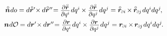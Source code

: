 \nopagebreak\vspace{-0.1em}\en{\vspace{-0.32em}}
\begin{equation}\label{areavectorascrossproduct}
\begin{array}{c}
\initialunitnormal \hspace{.1ex} do = d \initiallocationvector{'} \hspace{-0.5ex} \times \hspace{-0.1ex} d \initiallocationvector{''} \hspace{-0.5ex}
= \scalebox{0.9}{$ \displaystyle\frac{\raisemath{-0.2em}{\partial \initiallocationvector}}{\partial q^i} $} \hspace{.2ex} d q^i \hspace{-0.1ex} \times \scalebox{0.9}{$ \displaystyle\frac{\raisemath{-0.2em}{\partial \initiallocationvector}}{\partial q^{j}} $} \hspace{.2ex} d q^{j}
= \initiallocationvector_\differentialindex{i} \hspace{-0.16ex} \times \hspace{-0.1ex} \initiallocationvector_\differentialindex{\hspace{-0.1ex}j} \hspace{.2ex} dq^{i} dq^{j}
\hspace{-0.2ex} ,
\\[.8em]
%
\currentunitnormal \hspace{.1ex} d\mathcal{O} \hspace{-0.1ex} = d \currentlocationvector{'} \hspace{-0.4ex} \times \hspace{-0.1ex} d \currentlocationvector{''} \hspace{-0.5ex}
= \scalebox{0.9}{$ \displaystyle\frac{\raisemath{-0.23em}{\partial \currentlocationvector}}{\partial q^i} $} \hspace{.2ex} d q^i \hspace{-0.12ex} \times \scalebox{0.9}{$ \displaystyle\frac{\raisemath{-0.23em}{\partial \currentlocationvector}}{\partial q^{j}} $} \hspace{.2ex} d q^{j}
= \currentlocationvector_\differentialindex{i} \hspace{-0.1ex} \times \hspace{-0.2ex} \currentlocationvector_\differentialindex{\hspace{-0.1ex}j} \hspace{.2ex} dq^{i} dq^{j}
\hspace{-0.2ex} .
\end{array}
\end{equation}


